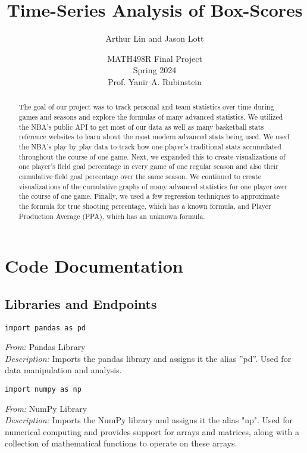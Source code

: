 \documentclass{article}
\title{Time-Series Analysis of Box-Scores}
\author{Arthur Lin and Jason Lott}
\date{MATH498R Final Project \\
Spring 2024 \\
Prof. Yanir A. Rubinstein}
\begin{document}
\maketitle
\newpage
\begin{abstract}
    The goal of our project was to track personal and team statistics over time during games and seasons and explore the formulas of many advanced statistics. We utilized the NBA's public API to get most of our data as well as many basketball stats reference websites to learn about the most modern advanced stats being used. We used the NBA's play by play data to track how one player's traditional stats accumulated throughout the course of one game. Next, we expanded this to create visualizations of one player's field goal percentage in every game of one regular season and also their cumulative field goal percentage over the same season. We continued to create visualizations of the cumulative graphs of many advanced statistics for one player over the course of one game. Finally, we used a few regression techniques to approximate the formula for true shooting percentage, which has a known formula, and Player Production Average (PPA), which has an unknown formula.
\end{abstract}
\newpage

\tableofcontents

\newpage

\section{Code Documentation}

\subsection{Libraries and Endpoints}

\begin{lstlisting}
import pandas as pd
\end{lstlisting}
\textit{From:} Pandas Library\\
\textit{Description:} Imports the pandas library and assigns it the alias ”pd”. Used for data manipulation and analysis.

\begin{lstlisting}
import numpy as np
\end{lstlisting}
\textit{From:} NumPy Library\\
\textit{Description:} Imports the NumPy library and assigns it the alias "np". Used for numerical computing and provides support for arrays and matrices, along with a collection of mathematical functions to operate on these arrays.
\end{document}
